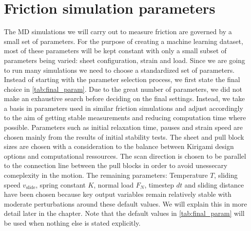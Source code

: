 \section{Friction simulation parameters}
The \acrshort{MD} simulations we will carry out to measure friction are governed
by a small set of parameters. For the purpose of creating a machine learning
dataset, most of these parameters will be kept constant with only a small subset
of parameters being varied: sheet configuration, strain and load. Since we are going to run many simulations we need to choose a standardized set of parameters. Instead of starting with the parameter selection process, we first state the final choice in \cref{tab:final_param}. Due to the great number of parameters, we did not make an exhaustive search before deciding on the final settings. Instead, we take a basis in parameters used in similar friction simulations
\cite{li_evolving_2016, Yoon2015MolecularDS, liu_high-speed_2014,
zhu_study_2018, ma12091425} and adjust accordingly to the aim of
getting stable measurements and reducing computation time where possible. 
Parameters such as initial relaxation time, pauses and strain speed are chosen mainly from the results of initial stability tests. The sheet and pull block sizes are chosen with a consideration to the balance between Kirigami design options and computational ressources. The scan direction is chosen to be parallel to the connection line between the pull blocks in order to avoid unessecary comeplexity in the motion. The remaining parameters: Temperature $T$, sliding speed $v_{\text{slide}}$, spring constant $K$, normal load $F_N$, timestep $dt$ and sliding distance have been chosen because key output variables remain relatively stable with moderate perturbations around these default values. We will explain this in more detail later in the chapter. Note that the default values in \cref{tab:final_param} will be used when nothing else is stated explicitly.







